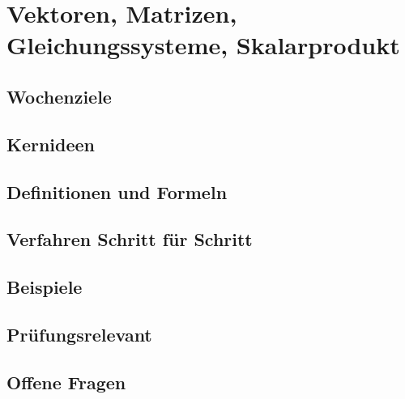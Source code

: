 \chapter{Vektoren, Matrizen, Gleichungssysteme, Skalarprodukt}
\label{kap:01-vektoren}

\section*{Wochenziele}
\begin{wochenziele}
\end{wochenziele}

\section{Kernideen}

\section{Definitionen und Formeln}

\section{Verfahren Schritt für Schritt}

\section{Beispiele}

\section{Prüfungsrelevant}

\section{Offene Fragen}
